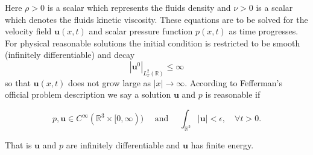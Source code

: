 \documentclass[amsmath,12pt,a4paper]{amsart}
\begin{document}
Here $\rho>0$ is a scalar which represents the fluids density and $\nu>0$ is a scalar which denotes the fluids kinetic viscosity. These equations are to be solved for the velocity field $\textbf{u}(x,t)$ and scalar pressure function $p(x,t)$ as time progresses. For physical reasonable solutions the initial condition is restricted to be smooth (infinitely differentiable) and decay $$|\textbf{u}^0|_{L^2_{x}(\mathbb{R})}\le \infty$$ so that $\textbf{u}(x,t)$ does not grow large as $|x|\rightarrow \infty$. According to Fefferman's official problem description \cite{Feff2006} we say a solution $\textbf{u}$ and $p$ is reasonable if

\begin{equation}\label{Eq4}
p, \textbf{u}\in C^{\infty}(\mathbb{R}^3\times [0,\infty)) \quad \text{ and } \quad \int_{\mathbb{R}^3}^{}{|\textbf{u}|} < \epsilon, \quad\forall t >0.
\end{equation}

That is $\textbf{u}$ and $p$ are infinitely differentiable and $\textbf{u}$ has finite energy. 
\end{document}
